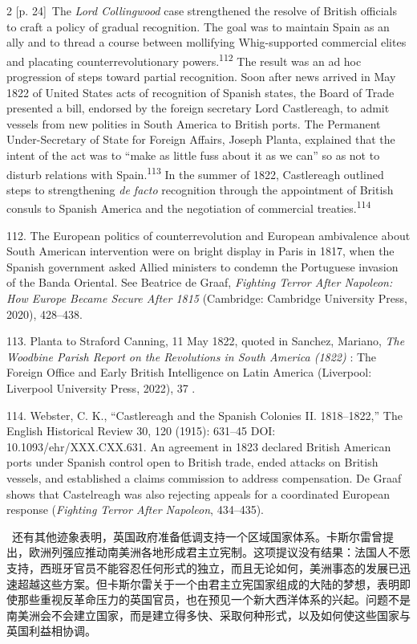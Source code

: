 \documentclass[10pt,a4paper]{article}
\begin{document}
\begin{paracol}{2}
{\scriptsize\color{gray} [p. 24]}\ The \textit{Lord Collingwood} case strengthened the resolve of British officials to craft a policy of gradual recognition. The goal was to maintain Spain as an ally and to thread a course between mollifying Whig-supported commercial elites and placating counterrevolutionary powers.\nobreak\textsuperscript{112} The result was an ad hoc progression of steps toward partial recognition. Soon after news arrived in May 1822 of United States acts of recognition of Spanish states, the Board of Trade presented a bill, endorsed by the foreign secretary Lord Castlereagh, to admit vessels from new polities in South America to British ports. The Permanent Under-Secretary of State for Foreign Affairs, Joseph Planta, explained that the intent of the act was to “make as little fuss about it as we can” so as not to disturb relations with Spain.\nobreak\textsuperscript{113} In the summer of 1822, Castlereagh outlined steps to strengthening \textit{de facto} recognition through the appointment of British consuls to Spanish America and the negotiation of commercial treaties.\nobreak\textsuperscript{114}\par{\small 112. The European politics of counterrevolution and European ambivalence about South American intervention were on bright display in Paris in 1817, when the Spanish government asked Allied ministers to condemn the Portuguese invasion of the Banda Oriental. See Beatrice de Graaf, \textit{Fighting Terror After Napoleon: How Europe Became Secure After 1815} (Cambridge: Cambridge University Press, 2020), 428–438.\par}{\small 113. Planta to Straford Canning, 11 May 1822, quoted in Sanchez, Mariano, \textit{The Woodbine Parish Report on the Revolutions in South America (1822)} : The Foreign Office and Early British Intelligence on Latin America (Liverpool: Liverpool University Press, 2022), 37 .\par}{\small 114. Webster, C. K., “Castlereagh and the Spanish Colonies II. 1818–1822,” The English Historical Review 30, 120 (1915): 631–45 DOI: 10.1093/ehr/XXX.CXX.631. An agreement in 1823 declared British American ports under Spanish control open to British trade, ended attacks on British vessels, and established a claims commission to address compensation. De Graaf shows that Castelreagh was also rejecting appeals for a coordinated European response (\textit{Fighting Terror After Napoleon}, 434–435).\par}
\switchcolumn*
{\scriptsize\color{gray} [p. 25]}\ 还有其他迹象表明，英国政府准备低调支持一个区域国家体系。卡斯尔雷曾提出，欧洲列强应推动南美洲各地形成君主立宪制。这项提议没有结果：法国人不愿支持，西班牙官员不能容忍任何形式的独立，而且无论如何，美洲事态的发展已迅速超越这些方案。但卡斯尔雷关于一个由君主立宪国家组成的大陆的梦想，表明即使那些重视反革命压力的英国官员，也在预见一个新大西洋体系的兴起。问题不是南美洲会不会建立国家，而是建立得多快、采取何种形式，以及如何使这些国家与英国利益相协调。\par

\end{paracol}
\end{document}
